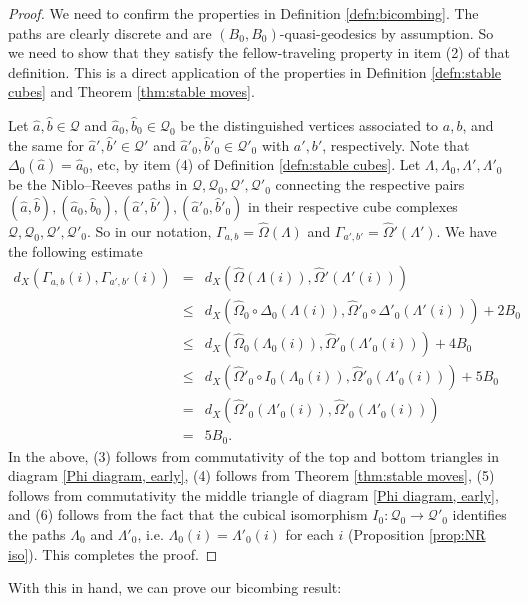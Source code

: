 \documentclass{amsart}
\theoremstyle{definition}
\theoremstyle{remark}
\theoremstyle{definition}
\newcommand{\calQ}{\mathcal{Q}}
\newcommand{\ha}{\hat{a}}
\newcommand{\hb}{\hat{b}}
\newcommand{\hO}{\widehat{\Omega}}
\begin{document}
\begin{proof}
We need to confirm the properties in Definition \ref{defn:bicombing}.  The paths are clearly discrete and are $(B_0,B_0)$-quasi-geodesics by assumption.  So we need to show that they satisfy the fellow-traveling property in item (2) of that definition.  This is a direct application of the properties in Definition \ref{defn:stable cubes} and Theorem \ref{thm:stable moves}.

Let $\ha,\hb \in \calQ$ and $\ha_0,\hb_0 \in \calQ_0$ be the distinguished vertices associated to $a,b$, and the same for $\ha',\hb' \in \calQ'$ and $\ha'_0,\hb'_0 \in \calQ'_0$ with $a',b'$, respectively.  Note that $\Delta_0(\ha) = \ha_0$, etc, by item (4) of Definition \ref{defn:stable cubes}.  Let $\Lambda, \Lambda_0, \Lambda',\Lambda'_0$ be the Niblo--Reeves paths in $\calQ,\calQ_0,\calQ',\calQ'_0$ connecting the respective pairs $(\ha,\hb), (\ha_0,\hb_0), (\ha',\hb'), (\ha'_0,\hb'_0)$ in their respective cube complexes $\calQ,\calQ_0,\calQ',\calQ'_0$.  So in our notation, $\Gamma_{a,b} = \hO(\Lambda)$ and $\Gamma_{a',b'} = \hO'(\Lambda')$.  We have the following estimate
\begin{eqnarray}
d_X(\Gamma_{a,b}(i), \Gamma_{a',b'}(i)) &=& d_X(\hO(\Lambda(i)), \hO'(\Lambda'(i)))\\
&\leq& d_X(\hO_0 \circ \Delta_0(\Lambda(i)), \hO'_0 \circ \Delta'_0 (\Lambda'(i))) + 2B_0\\
&\leq& d_X(\hO_0(\Lambda_0(i)), \hO'_0(\Lambda'_0(i))) + 4B_0\\
&\leq& d_X(\hO'_0 \circ I_0(\Lambda_0(i)), \hO'_0(\Lambda'_0(i))) + 5B_0\\
&=& d_X(\hO'_0(\Lambda'_0(i)), \hO'_0(\Lambda'_0(i)))\\
&=& 5B_0.
\end{eqnarray}
In the above, (3) follows from commutativity of the top and bottom triangles in diagram \ref{Phi diagram, early}, (4) follows from Theorem \ref{thm:stable moves}, (5) follows from commutativity the middle triangle of diagram \ref{Phi diagram, early}, and (6) follows from the fact that the cubical isomorphism $I_0:\calQ_0 \to \calQ'_0$ identifies the paths $\Lambda_0$ and $\Lambda'_0$, i.e. $\Lambda_0(i) = \Lambda'_0(i)$ for each $i$ (Proposition \ref{prop:NR iso}).  This completes the proof.


\end{proof}

With this in hand, we can prove our bicombing result:
\end{document}
